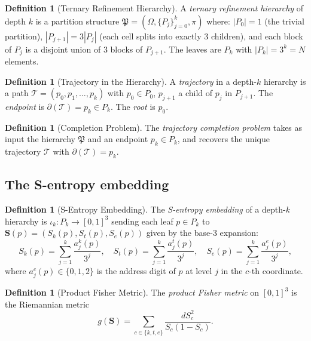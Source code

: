 \documentclass[twocolumn,10pt,a4paper]{article}
\theoremstyle{thmstyle}
\theoremstyle{definition}
\newtheorem{definition}[theorem]{Definition}
\theoremstyle{remark}
\newcommand{\Sk}{S_{k}}
\newcommand{\St}{S_{t}}
\newcommand{\Se}{S_{e}}
\newcommand{\Svec}{\mathbf{S}}
\begin{document}
\begin{definition}[Ternary Refinement Hierarchy]
\label{def:ternary_hierarchy}
A \emph{ternary refinement hierarchy} of depth $k$ is a partition structure
$\mathfrak{P} = (\Omega, \{P_j\}_{j=0}^k, \pi)$ where:
$|P_0| = 1$ (the trivial partition),
$|P_{j+1}| = 3|P_j|$ (each cell splits into exactly 3 children),
and each block of $P_j$ is a disjoint union of 3 blocks of $P_{j+1}$.
The leaves are $P_k$ with $|P_k| = 3^k = N$ elements.
\end{definition}

\begin{definition}[Trajectory in the Hierarchy]
\label{def:trajectory}
A \emph{trajectory} in a depth-$k$ hierarchy is a path
$\mathcal{T} = (p_0, p_1, \ldots, p_k)$ with $p_0 \in P_0$,
$p_{j+1}$ a child of $p_j$ in $P_{j+1}$.
The \emph{endpoint} is $\partial(\mathcal{T}) = p_k \in P_k$.
The \emph{root} is $p_0$.
\end{definition}

\begin{definition}[Completion Problem]
\label{def:completion}
The \emph{trajectory completion problem} takes as input the hierarchy
$\mathfrak{P}$ and an endpoint $p_k \in P_k$, and recovers the unique
trajectory $\mathcal{T}$ with $\partial(\mathcal{T}) = p_k$.
\end{definition}

\subsection{The S-entropy embedding}

\begin{definition}[S-Entropy Embedding]
\label{def:s_embed}
The \emph{S-entropy embedding} of a depth-$k$ hierarchy is
$\iota_k : P_k \to [0,1]^3$ sending each leaf $p \in P_k$ to
$\Svec(p) = (\Sk(p), \St(p), \Se(p))$ given by the base-3 expansion:
\[
\Sk(p) = \sum_{j=1}^k \frac{a_j^k(p)}{3^j}, \quad
\St(p) = \sum_{j=1}^k \frac{a_j^t(p)}{3^j}, \quad
\Se(p) = \sum_{j=1}^k \frac{a_j^e(p)}{3^j},
\]
where $a_j^c(p) \in \{0,1,2\}$ is the address digit of $p$ at level $j$
in the $c$-th coordinate.
\end{definition}

\begin{definition}[Product Fisher Metric]
The \emph{product Fisher metric} on $[0,1]^3$ is the Riemannian metric
\[
g(\Svec) = \sum_{c \in \{k,t,e\}} \frac{dS_c^2}{S_c(1-S_c)}.
\]
\end{definition}
\end{document}
